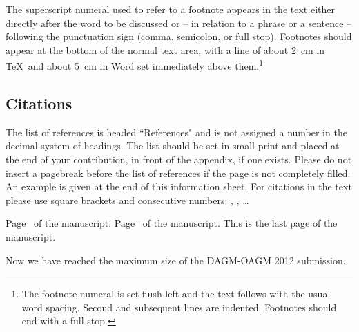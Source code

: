 \documentclass[runningheads]{llncs}
\begin{document}
The superscript numeral used to refer to a footnote appears in the text
either directly after the word to be discussed or -- in relation to a
phrase or a sentence -- following the punctuation sign (comma,
semicolon, or full stop). Footnotes should appear at the bottom of
the
normal text area, with a line of about 2~cm in \TeX\ and about 5~cm in
Word set
immediately above them.\footnote{The footnote numeral is set flush left
and the text follows with the usual word spacing. Second and subsequent
lines are indented. Footnotes should end with a full stop.}

\subsection{Citations}

The list of references is headed ``References" and is not assigned a
number
in the decimal system of headings. The list should be set in small print
and placed at the end of your contribution, in front of the appendix,
if one exists.
Please do not insert a pagebreak before the list of references if the
page is not completely filled.
An example is given at the
end of this information sheet. For citations in the text please use
square brackets and consecutive numbers: \cite{Alpher02},
\cite{Alpher03}, \cite{Alpher04} \dots





\clearpage\mbox{}Page \thepage\ of the manuscript.
\clearpage\mbox{}Page \thepage\ of the manuscript.
This is the last page of the manuscript. 
\par\vfill\par
Now we have reached the maximum size of the DAGM-OAGM 2012 submission.
\end{document}
